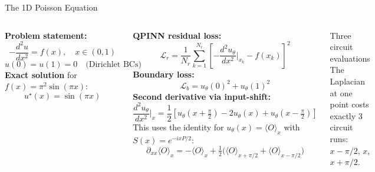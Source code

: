 \documentclass[aspectratio=169,10pt]{beamer}
\begin{document}
\begin{frame}{The 1D Poisson Equation}
  \begin{columns}[T]
      \textbf{Problem statement:}
      \[
        -\frac{d^2 u}{dx^2} = f(x),\quad x\in(0,1)
      \]
      \[
        u(0) = u(1) = 0 \quad\text{(Dirichlet BCs)}
      \]
      \textbf{Exact solution} for $f(x) = \pi^2\sin(\pi x)$:
      \[
        u^\star(x) = \sin(\pi x)
      \]

      \textbf{QPINN residual loss:}
      \[
        \mathcal{L}_r = \frac{1}{N_r}\sum_{k=1}^{N_r}
          \left[-\frac{d^2 u_\theta}{dx^2}\bigg|_{x_k}
                - f(x_k)\right]^2
      \]
      \textbf{Boundary loss:}
      \[
        \mathcal{L}_b = u_\theta(0)^2 + u_\theta(1)^2
      \]
      \textbf{Second derivative via input-shift:}
      \[
        \frac{d^2 u_\theta}{dx^2}\bigg|_x
        = \frac{1}{2}\left[
            u_\theta(x{+}\tfrac\pi2)
            - 2u_\theta(x)
            + u_\theta(x{-}\tfrac\pi2)
          \right]
      \]
      This uses the identity for $u_\theta(x)
      = \langle O\rangle_{x}$
      with $S(x) = e^{-ixP/2}$:
      \[
        \partial_{xx}\langle O\rangle_x
        = -\langle O\rangle_x + \tfrac12\bigl(
          \langle O\rangle_{x+\pi/2}
          + \langle O\rangle_{x-\pi/2}\bigr)
      \]
      \begin{alertblock}{Three circuit evaluations}
        The Laplacian at one point costs exactly 3 circuit
        runs: $x-\pi/2$, $x$, $x+\pi/2$.
      \end{alertblock}
  \end{columns}
\end{frame}
\end{document}
